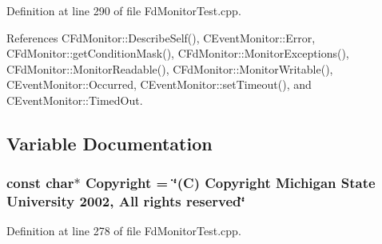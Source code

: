 Definition at line 290 of file Fd\-Monitor\-Test.cpp.

References CFd\-Monitor::Describe\-Self(), CEvent\-Monitor::Error, CFd\-Monitor::get\-Condition\-Mask(), CFd\-Monitor::Monitor\-Exceptions(), CFd\-Monitor::Monitor\-Readable(), CFd\-Monitor::Monitor\-Writable(), CEvent\-Monitor::Occurred, CEvent\-Monitor::set\-Timeout(), and CEvent\-Monitor::Timed\-Out.

\subsection{Variable Documentation}
\subsubsection{\setlength{\rightskip}{0pt plus 5cm}const char$\ast$ Copyright = \char`\"{}(C) Copyright Michigan State University 2002, All rights reserved\char`\"{}\hspace{0.3cm}{\tt  [static]}}\label{FdMonitorTest_8cpp_a0}




Definition at line 278 of file Fd\-Monitor\-Test.cpp.